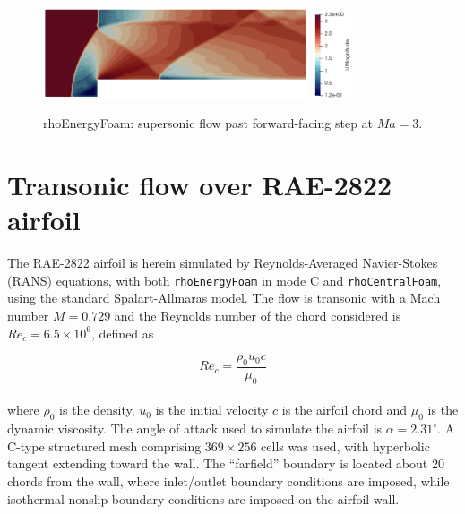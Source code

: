 \documentclass[a5paper]{sapthesis}
\begin{document}
	\begin{figure}[h]
		\centering
		\subfloat
		{\includegraphics[width=0.7\textwidth]{Figures/FS_velocity}} \quad 
		\subfloat
		\centering
		{\includegraphics[width=0.1\textwidth, height=0.16\textheight]{Figures/FS_velocitybar}}
		\caption{rhoEnergyFoam: supersonic ﬂow past forward-facing step at $Ma = 3$.}
		\label{FS_ref}
	\end{figure}
	
	\section{Transonic flow over RAE-2822 airfoil}
	The RAE-2822 airfoil is herein simulated by Reynolds-Averaged Navier-Stokes (RANS) equations, with both \texttt{rhoEnergyFoam} in mode C and \texttt{rhoCentralFoam}, using the standard Spalart-Allmaras model. The flow is transonic with a Mach number $M = 0.729$ and the Reynolds number of the chord considered is $Re_c = 6.5 \times 10^6$, defined as
	
	\begin{equation}
		Re_c = \frac{\rho_0 u_0 c}{\mu_0} 
	\end{equation}
	\\
	where $\rho_0$ is the density, $u_0$ is the initial velocity $c$ is the airfoil chord and $\mu_0$ is the dynamic viscosity. The angle of attack used to simulate the airfoil is $\alpha = 2.31^\circ$. A C-type structured mesh comprising $369 \times 256$ cells was used, with hyperbolic tangent extending toward the wall. The “farfield” boundary is located about 20 chords from the wall, where inlet/outlet boundary conditions are imposed, while isothermal nonslip boundary conditions are imposed on the airfoil wall.
	
\end{document}
